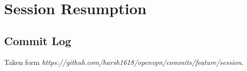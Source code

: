 \documentclass[11pt,oneside]{book}
\begin{document}
\chapter{Session Resumption}
\label{Session:Commit}
\section{Commit Log}
Taken form \emph{https://github.com/harsh1618/openvpn/commits/feature/session}.\\





\printindex
{}
\end{document}
